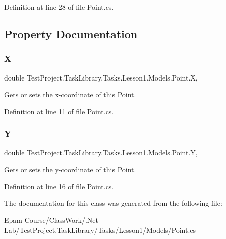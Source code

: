 Definition at line 28 of file Point.\+cs.



\subsection{Property Documentation}
\mbox{\label{class_test_project_1_1_task_library_1_1_tasks_1_1_lesson1_1_1_models_1_1_point_a1863bc017fd8d4ee1d3383e710a54830}} 
\subsubsection{\texorpdfstring{X}{X}}
{\footnotesize\ttfamily double Test\+Project.\+Task\+Library.\+Tasks.\+Lesson1.\+Models.\+Point.\+X\hspace{0.3cm}{\ttfamily [get]}, {\ttfamily [set]}}



Gets or sets the x-\/coordinate of this \mbox{\hyperlink{class_test_project_1_1_task_library_1_1_tasks_1_1_lesson1_1_1_models_1_1_point}{Point}}. 



Definition at line 11 of file Point.\+cs.

\mbox{\label{class_test_project_1_1_task_library_1_1_tasks_1_1_lesson1_1_1_models_1_1_point_a51ebde555adf9b621b2a171ac19d3158}} 
\subsubsection{\texorpdfstring{Y}{Y}}
{\footnotesize\ttfamily double Test\+Project.\+Task\+Library.\+Tasks.\+Lesson1.\+Models.\+Point.\+Y\hspace{0.3cm}{\ttfamily [get]}, {\ttfamily [set]}}



Gets or sets the y-\/coordinate of this \mbox{\hyperlink{class_test_project_1_1_task_library_1_1_tasks_1_1_lesson1_1_1_models_1_1_point}{Point}}. 



Definition at line 16 of file Point.\+cs.



The documentation for this class was generated from the following file\+:\begin{DoxyCompactItemize}
\item 
Epam Course/\+Class\+Work/.\+Net-\/\+Lab/\+Test\+Project.\+Task\+Library/\+Tasks/\+Lesson1/\+Models/Point.\+cs\end{DoxyCompactItemize}
